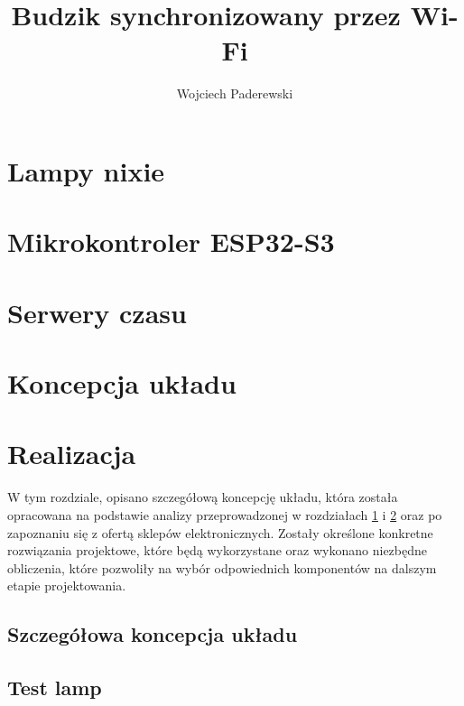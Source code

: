 \documentclass[twoside]{article}
\title{Budzik synchronizowany przez Wi-Fi}
\author{Wojciech Paderewski}
\begin{document}

\thispagestyle{empty}
\cleardoublepage


\cleardoublepage

\tableofcontents
\newpage

\cleardoublepage


\newpage

\section{Lampy nixie}

\label{sec:nixie}
\newpage


\section{Mikrokontroler ESP32-S3}
\label{sec:esp32}

\newpage


\section{Serwery czasu}
\label{sec:serwery_czasu}

\newpage


\section{Koncepcja układu}

\newpage

\section{Realizacja}
\label{sec:realizacja}
W tym rozdziale, opisano szczegółową koncepcję układu, która została opracowana na podstawie analizy przeprowadzonej w rozdziałach \ref{sec:nixie} i \ref{sec:esp32} 
oraz po zapoznaniu się z ofertą sklepów elektronicznych.
Zostały określone konkretne rozwiązania projektowe, które będą wykorzystane oraz wykonano niezbędne obliczenia,
które pozwoliły na wybór odpowiednich komponentów na dalszym etapie projektowania.

\subsection{Szczegółowa koncepcja układu}

\newpage

\subsection{Test lamp}

\newpage
\end{document}
